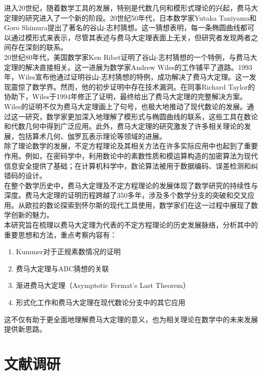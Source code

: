 \documentclass{article}
\begin{document}
\noindent
进入20世纪，随着数学工具的发展，特别是代数几何和模形式理论的兴起，费马大定理的研究进入了一个新的阶段。20世纪50年代，日本数学家Yutaka Taniyama和Goro Shimura提出了著名的谷山-志村猜想。这一猜想表明，每一条椭圆曲线都可以通过模形式来表示，尽管其表述与费马大定理表面上无关，但研究者发现两者之间存在深刻的联系。\\

\noindent
20世纪80年代，美国数学家Ken Ribet证明了谷山-志村猜想的一个特例，与费马大定理的解决直接相关。这一进展为数学家Andrew Wiles的工作铺平了道路。1993年，Wiles宣布他通过证明谷山-志村猜想的特例，成功解决了费马大定理。这一发现震惊了数学界。然而，他的初步证明中存在技术漏洞。在同事Richard Taylor的协助下，Wiles于1994年修正了证明，最终给出了费马大定理的完整解决方案。\\

\noindent
Wiles的证明不仅为费马大定理画上了句号，也极大地推动了现代数论的发展。通过这一研究，数学家更加深入地理解了模形式与椭圆曲线的联系，这些工具在数论和代数几何中得到广泛应用。此外，费马大定理的研究激发了许多相关理论的发展，包括算术几何、伽罗瓦表示理论等领域的进展。\\

\noindent
除了理论数学的发展，不定方程理论及其相关方法在许多实际应用中也起到了重要作用。例如，在密码学中，利用数论中的素数性质和模运算构造的加密算法为现代信息安全提供了基础；在计算机科学中，数论算法被用于数据编码、误差检测和纠错码的设计。\\

\noindent
在整个数学历史中，费马大定理及不定方程理论的发展体现了数学研究的持续性与深度。费马大定理的证明历程跨越了350多年，涉及多个数学分支的突破和交叉应用。从欧拉的数论探索到怀尔斯的现代工具使用，数学家们在这一过程中展现了数学创新的魅力。\\

\noindent
本研究旨在梳理以费马大定理为代表的不定方程理论的历史发展脉络，分析其中的重要思想和方法，重点考察内容有：
\begin{enumerate}
\item Kummer对于正规素数情况的证明
\item 费马大定理与ABC猜想的关联
\item 渐进费马大定理（Asymptotic Fermat's Last Theorem）
\item 形式化工作和费马大定理在现代数论分支中的其它应用
\end{enumerate}
这不仅有助于更全面地理解费马大定理的意义，也为相关理论在数学中的未来发展提供新思路。

\section{文献调研}
\end{document}
